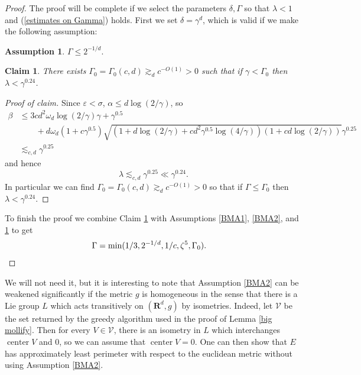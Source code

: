 \documentclass[reqno,12pt,letterpaper]{amsart}
\newcommand{\RR}{\mathbf{R}}
\DeclareMathOperator{\cent}{center}
\newtheorem{claim}[theorem]{Claim}
\theoremstyle{definition}
\newtheorem{assumption}[theorem]{Assumption}
\numberwithin{equation}{section}
\begin{document}
\begin{proof}
The proof will be complete if we select the parameters $\delta,\Gamma$ so that $\lambda < 1$ and (\ref{estimates on Gamma}) holds.
First we set $\delta = \gamma^d$, which is valid if we make the following assumption:
\begin{assumption}\label{BMA3}
$\Gamma \leq 2^{-1/d}$.
\end{assumption}

\begin{claim}\label{BMC3}
There exists $\Gamma_0 = \Gamma_0(c, d) \gtrsim_d c^{-O(1)} > 0$ such that if $\gamma < \Gamma_0$ then $\lambda < \gamma^{0.24}$.
\end{claim}
\begin{proof}[Proof of claim]
Since $\varepsilon < \sigma$, $\alpha \leq d\log(2/\gamma)$, so
\begin{align*}
\beta &\leq 3cd^2\omega_d\log(2/\gamma)\gamma +  \gamma^{0.5}\\
&\qquad+ d\omega_d(1 + c\gamma^{0.5})\sqrt{(1 + d\log(2/\gamma) + cd^2\gamma^{0.5}\log(4/\gamma))(1 + cd\log(2/\gamma))}\gamma^{0.25}\\
&\lesssim_{c, d} \gamma^{0.25}
\end{align*}
and hence
$$\lambda \lesssim_{c, d} \gamma^{0.25} \ll \gamma^{0.24}.$$
In particular we can find $\Gamma_0 = \Gamma_0(c, d) \gtrsim_d c^{-O(1)} > 0$ so that if $\Gamma \leq \Gamma_0$ then $\lambda < \gamma^{0.24}$.
\end{proof}

To finish the proof we combine Claim \ref{BMC3} with Assumptions \ref{BMA1}, \ref{BMA2}, and \ref{BMA3} to get
\begin{align*}\Gamma &= \min(1/3, 2^{-1/d}, 1/c, \zeta^5, \Gamma_0). \qedhere
\end{align*}
\end{proof}

We will not need it, but it is interesting to note that Assumption \ref{BMA2} can be weakened significantly if the metric $g$ is homogeneous in the sense that there is a Lie group $L$ which acts transitively on $(\RR^d, g)$ by isometries.
Indeed, let $\mathcal V$ be the set returned by the greedy algorithm used in the proof of Lemma \ref{big mollify}.
Then for every $V \in \mathcal V$, there is an isometry in $L$ which interchanges $\cent V$ and $0$, so we can assume that $\cent V = 0$.
One can then show that $E$ has approximately least perimeter with respect to the euclidean metric without using Assumption \ref{BMA2}.
\end{document}
